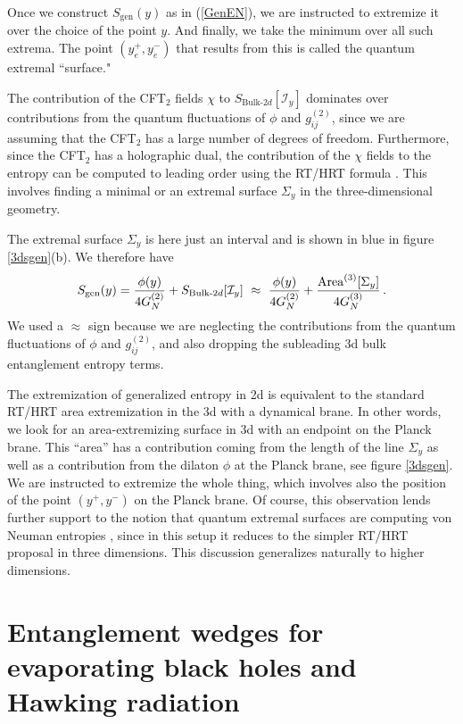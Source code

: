 \documentclass[12pt]{article}
\def\nref#1{(\ref{#1})}
\begin{document}
Once we construct $S_\text{gen}(y)$ as in \nref{GenEN}, we are instructed to extremize it over the choice of the point $y$. 
And finally, we take the minimum over all such extrema. 
The point $(y_e^+,y_e^-)$ that results from this is called the quantum extremal ``surface."

The contribution of the CFT$_2$ fields $\chi$ to $S_{\mathrm{Bulk}\text{-}2d}[\mathcal{I}_y]$ dominates over contributions from the quantum fluctuations of $\phi$ and $g_{ij}^{(2)}$, since we are assuming that the CFT$_2$ has a large number of degrees of freedom.
Furthermore, since the CFT$_2$  has a holographic dual, the contribution of the $\chi$ fields to the entropy can be computed to leading order using the RT/HRT formula \cite{Ryu:2006bv,Hubeny:2007xt}. 
This involves  finding a minimal or an extremal surface $\Sigma_y$ in the three-dimensional geometry.

The extremal surface $\Sigma_y $ is here just an interval and is shown in blue in  figure \ref{3dsgen}(b).
We therefore have
\begin{align}
    S_\mathrm{gen}(y)  =  {\phi(y)  \over 4 G_N^{(2)} } + 
    S_{\mathrm{Bulk}\text{-}2d}[\mathcal{I}_y]
    ~ \approx ~    
    {\phi(y)  \over 4 G_N^{(2)} }  + 
    {\mathrm{Area}^{(3)}[ \Sigma_y ] \over 4 G_N^{(3)}} \, .
\end{align} 
We used a $\approx$ sign because we are neglecting the contributions from the quantum fluctuations of $\phi$ and $g_{ij}^{(2)}$, and also dropping the subleading 3d bulk entanglement entropy terms.

The extremization of generalized entropy in 2d is equivalent to the standard RT/HRT area extremization in the 3d with a dynamical brane.  
In other words, we look for an area-extremizing surface in 3d with an endpoint on the Planck brane. 
This ``area'' has a contribution coming from the length of the line $\Sigma_y$ as well as a contribution from the dilaton $\phi$ at the Planck brane, see figure \ref{3dsgen}.
We are instructed to extremize the whole thing, which involves also the position of the point $(y^+, y^-)$ on the Planck brane. 
Of course, this observation lends further support to the notion that quantum extremal surfaces are computing von Neuman entropies \cite{Engelhardt:2014gca}, since in this setup it reduces to the simpler RT/HRT proposal in three  dimensions.  This discussion generalizes naturally to higher dimensions.


\section{Entanglement wedges for evaporating black holes and Hawking radiation}   
\label{section:QES}
  
\end{document}
